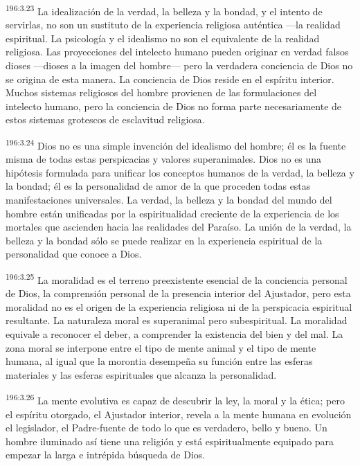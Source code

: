\par 
\textsuperscript{196:3.23} La idealización de la verdad, la belleza y la bondad, y el intento de servirlas, no son un sustituto de la experiencia religiosa auténtica ---la realidad espiritual. La psicología y el idealismo no son el equivalente de la realidad religiosa. Las proyecciones del intelecto humano pueden originar en verdad falsos dioses ---dioses a la imagen del hombre--- pero la verdadera conciencia de Dios no se origina de esta manera. La conciencia de Dios reside en el espíritu interior. Muchos sistemas religiosos del hombre provienen de las formulaciones del intelecto humano, pero la conciencia de Dios no forma parte necesariamente de estos sistemas grotescos de esclavitud religiosa.

\par 
\textsuperscript{196:3.24} Dios no es una simple invención del idealismo del hombre; él es la fuente misma de todas estas perspicacias y valores superanimales. Dios no es una hipótesis formulada para unificar los conceptos humanos de la verdad, la belleza y la bondad; él es la personalidad de amor de la que proceden todas estas manifestaciones universales. La verdad, la belleza y la bondad del mundo del hombre están unificadas por la espiritualidad creciente de la experiencia de los mortales que ascienden hacia las realidades del Paraíso. La unión de la verdad, la belleza y la bondad sólo se puede realizar en la experiencia espiritual de la personalidad que conoce a Dios.

\par 
\textsuperscript{196:3.25} La moralidad es el terreno preexistente esencial de la conciencia personal de Dios, la comprensión personal de la presencia interior del Ajustador, pero esta moralidad no es el origen de la experiencia religiosa ni de la perspicacia espiritual resultante. La naturaleza moral es superanimal pero subespiritual. La moralidad equivale a reconocer el deber, a comprender la existencia del bien y del mal. La zona moral se interpone entre el tipo de mente animal y el tipo de mente humana, al igual que la morontia desempeña su función entre las esferas materiales y las esferas espirituales que alcanza la personalidad.

\par 
\textsuperscript{196:3.26} La mente evolutiva es capaz de descubrir la ley, la moral y la ética; pero el espíritu otorgado, el Ajustador interior, revela a la mente humana en evolución el legislador, el Padre-fuente de todo lo que es verdadero, bello y bueno. Un hombre iluminado así tiene una religión y está espiritualmente equipado para empezar la larga e intrépida búsqueda de Dios.

